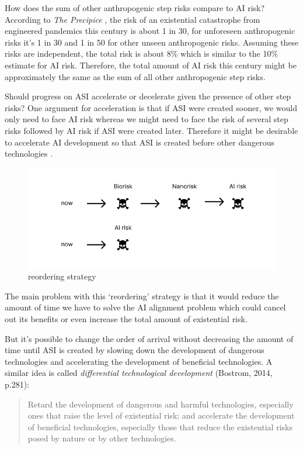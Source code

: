 \documentclass{article}
\begin{document}
How does the sum of other anthropogenic step risks compare to AI risk? According to \textit{The Precipice} \cite{theprecipice}, the risk of an existential catastrophe from engineered pandemics this century is about 1 in 30, for unforeseen anthropogenic risks it’s 1 in 30 and 1 in 50 for other unseen anthropogenic risks. Assuming these risks are independent, the total risk is about 8\% which is similar to the 10\% estimate for AI risk. Therefore, the total amount of AI risk this century might be approximately the same as the sum of all other anthropogenic step risks.

Should progress on ASI accelerate or decelerate given the presence of other step risks? One argument for acceleration is that if ASI were created sooner, we would only need to face AI risk whereas we might need to face the risk of several step risks followed by AI risk if ASI were created later. Therefore it might be desirable to accelerate AI development so that ASI is created before other dangerous technologies \cite{superintelligence}.

\begin{figure}[h]
\includegraphics[width=12cm]{reordering}
\centering
\caption{reordering strategy}
\end{figure}

The main problem with this ‘reordering’ strategy is that it would reduce the amount of time we have to solve the AI alignment problem which could cancel out its benefits or even increase the total amount of existential risk.

But it’s possible to change the order of arrival without decreasing the amount of time until ASI is created by slowing down the development of dangerous technologies and accelerating the development of beneficial technologies. A similar idea is called \textit{differential technological development} (Bostrom, 2014, p.281):

\begin{quote}
Retard the development of dangerous and harmful technologies, especially ones
that raise the level of existential risk; and accelerate the development of
beneficial technologies, especially those that reduce the existential risks posed by nature or by other technologies.
\end{quote}
\end{document}
